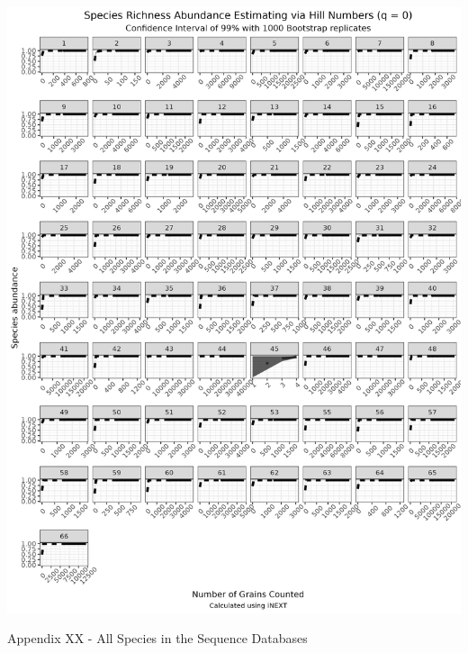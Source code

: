 \documentclass[
]{article}
\begin{document}
\includegraphics[width=0.99\linewidth]{../graphics/plots/SppAbundance}

\newpage

Appendix XX - All Species in the Sequence Databases
\end{document}

